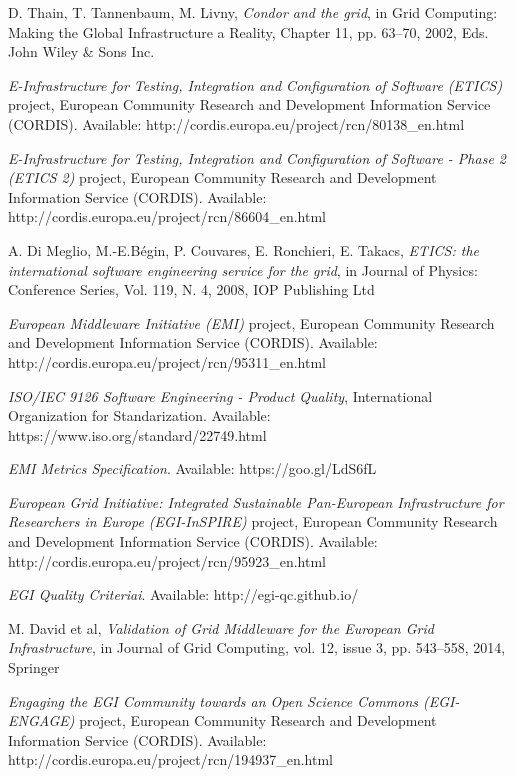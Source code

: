 \documentclass[journal]{IEEEtran}
\begin{document}
\begin{thebibliography}{1}
D. Thain, T. Tannenbaum, M. Livny, \emph{Condor and the grid}, in Grid Computing: Making the Global Infrastructure a Reality, Chapter 11, pp. 63–70, 2002, Eds. John Wiley \& Sons Inc.

\emph{E-Infrastructure for Testing, Integration and Configuration of Software (ETICS)} project, European Community Research and Development Information Service (CORDIS). Available: http://cordis.europa.eu/project/rcn/80138\_en.html

\emph{E-Infrastructure for Testing, Integration and Configuration of Software - Phase 2 (ETICS 2)} project, European Community Research and Development Information Service (CORDIS). Available: http://cordis.europa.eu/project/rcn/86604\_en.html

A. Di Meglio, M.-E.Bégin, P. Couvares, E. Ronchieri, E. Takacs, \emph{ETICS: the international software engineering service for the grid}, in Journal of Physics: Conference Series, Vol. 119, N. 4, 2008, IOP Publishing Ltd

\emph{European Middleware Initiative (EMI)} project, European Community Research and Development Information Service (CORDIS). Available: http://cordis.europa.eu/project/rcn/95311\_en.html

\emph{ISO/IEC 9126 Software Engineering - Product Quality}, International Organization for Standarization. Available: https://www.iso.org/standard/22749.html

\emph{EMI Metrics Specification}. Available: https://goo.gl/LdS6fL

\emph{European Grid Initiative: Integrated Sustainable Pan-European Infrastructure for Researchers in Europe (EGI-InSPIRE)} project, European Community Research and Development Information Service (CORDIS). Available: http://cordis.europa.eu/project/rcn/95923\_en.html

\emph{EGI Quality Criteriai}. Available: http://egi-qc.github.io/

M. David et al, \emph{Validation of Grid Middleware for the European Grid Infrastructure}, in Journal of Grid Computing, vol. 12, issue 3, pp. 543–558, 2014, Springer

\emph{Engaging the EGI Community towards an Open Science Commons (EGI-ENGAGE)} project, European Community Research and Development Information Service (CORDIS). Available: http://cordis.europa.eu/project/rcn/194937\_en.html


\end{thebibliography}
\end{document}
